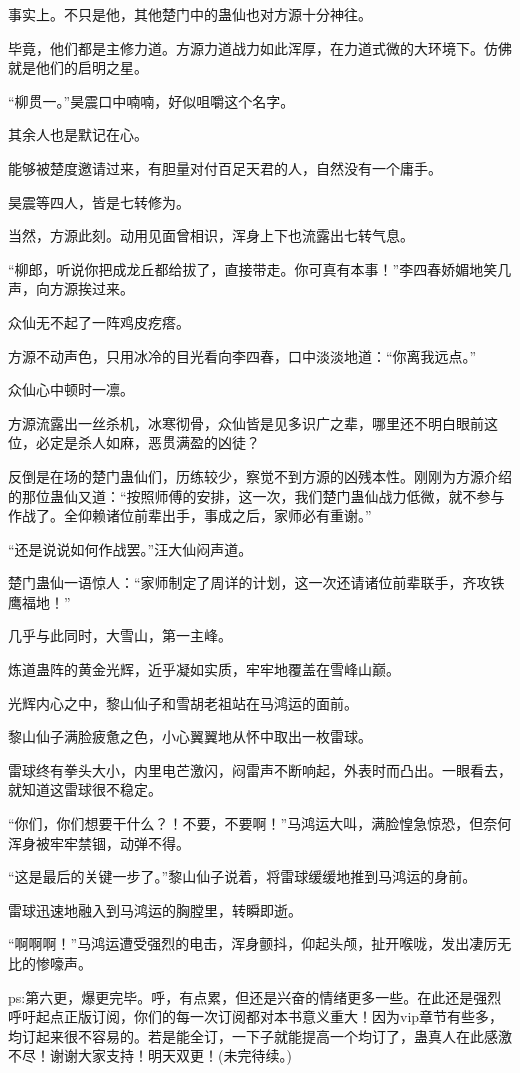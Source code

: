 \begin{this_body}
事实上。不只是他，其他楚门中的蛊仙也对方源十分神往。

毕竟，他们都是主修力道。方源力道战力如此浑厚，在力道式微的大环境下。仿佛就是他们的启明之星。

“柳贯一。”昊震口中喃喃，好似咀嚼这个名字。

其余人也是默记在心。

能够被楚度邀请过来，有胆量对付百足天君的人，自然没有一个庸手。

昊震等四人，皆是七转修为。

当然，方源此刻。动用见面曾相识，浑身上下也流露出七转气息。

“柳郎，听说你把成龙丘都给拔了，直接带走。你可真有本事！”李四春娇媚地笑几声，向方源挨过来。

众仙无不起了一阵鸡皮疙瘩。

方源不动声色，只用冰冷的目光看向李四春，口中淡淡地道：“你离我远点。”

众仙心中顿时一凛。

方源流露出一丝杀机，冰寒彻骨，众仙皆是见多识广之辈，哪里还不明白眼前这位，必定是杀人如麻，恶贯满盈的凶徒？

反倒是在场的楚门蛊仙们，历练较少，察觉不到方源的凶残本性。刚刚为方源介绍的那位蛊仙又道：“按照师傅的安排，这一次，我们楚门蛊仙战力低微，就不参与作战了。全仰赖诸位前辈出手，事成之后，家师必有重谢。”

“还是说说如何作战罢。”汪大仙闷声道。

楚门蛊仙一语惊人：“家师制定了周详的计划，这一次还请诸位前辈联手，齐攻铁鹰福地！”

几乎与此同时，大雪山，第一主峰。

炼道蛊阵的黄金光辉，近乎凝如实质，牢牢地覆盖在雪峰山巅。

光辉内心之中，黎山仙子和雪胡老祖站在马鸿运的面前。

黎山仙子满脸疲惫之色，小心翼翼地从怀中取出一枚雷球。

雷球终有拳头大小，内里电芒激闪，闷雷声不断响起，外表时而凸出。一眼看去，就知道这雷球很不稳定。

“你们，你们想要干什么？！不要，不要啊！”马鸿运大叫，满脸惶急惊恐，但奈何浑身被牢牢禁锢，动弹不得。

“这是最后的关键一步了。”黎山仙子说着，将雷球缓缓地推到马鸿运的身前。

雷球迅速地融入到马鸿运的胸膛里，转瞬即逝。

“啊啊啊！”马鸿运遭受强烈的电击，浑身颤抖，仰起头颅，扯开喉咙，发出凄厉无比的惨嚎声。

ps:第六更，爆更完毕。呼，有点累，但还是兴奋的情绪更多一些。在此还是强烈呼吁起点正版订阅，你们的每一次订阅都对本书意义重大！因为vip章节有些多，均订起来很不容易的。若是能全订，一下子就能提高一个均订了，蛊真人在此感激不尽！谢谢大家支持！明天双更！(未完待续。)

\end{this_body}

